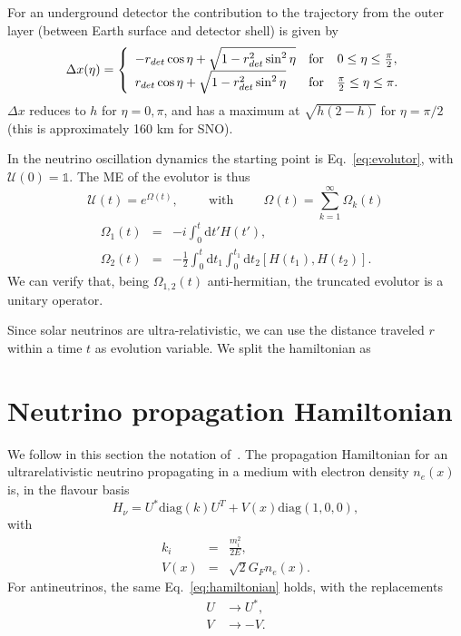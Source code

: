 \documentclass{article}
\newcommand{\de}[0]{\text{d}}
\begin{document}
For an underground detector the contribution to the trajectory from the outer layer (between Earth surface and detector shell) is given by
\begin{equation}
	 \Delta x(\eta) = \left\{ \begin{array}{l c c}
		-r_{det} \cos\eta + \sqrt{1 - r_{det}^2 \sin^2 \eta} & \text{for} & 0 \leq \eta \leq \frac{\pi}{2}, \\
		r_{det} \cos\eta + \sqrt{1 - r_{det}^2 \sin^2 \eta} & \text{for} & \frac{\pi}{2} \leq \eta \leq \pi.
	\end{array} \right.
\end{equation}
$\Delta x$ reduces to $h$ for $\eta=0, \pi$, and has a maximum at $\sqrt{h(2-h)}$ for $\eta=\pi/2$ (this is approximately 160 km for SNO).

In the neutrino oscillation dynamics the starting point is Eq.~\ref{eq:evolutor}, with ${\mathcal{U}(0) = \mathbb{1}}$. The ME of the evolutor is thus
\begin{equation}
	\mathcal{U}(t) = e^{\Omega(t)},\hspace{1cm} \text{with} \hspace{1cm} \Omega(t) = \sum_{k=1}^\infty \Omega_k (t)
\end{equation}
\begin{eqnarray}
	\Omega_1(t) &=& -i \int_0^t \de t' H(t'), \label{eq:ME1}\\
	\Omega_2(t) &=& -\frac{1}{2} \int_0^t \de t_1 \int_0^{t_1} \de t_2 \left[ H(t_1), H(t_2) \right]. \label{eq:ME2}
\end{eqnarray}
We can verify that, being $\Omega_{1,2}(t)$ anti-hermitian, the truncated evolutor is a unitary operator.

Since solar neutrinos are ultra-relativistic, we can use the distance traveled $r$ within a time $t$ as evolution variable. We split the hamiltonian as

\section{Neutrino propagation Hamiltonian}
We follow in this section the notation of~\cite{Fantini:2018itu}.
The propagation Hamiltonian for an ultrarelativistic neutrino propagating in a medium with electron density $n_e(x)$ is, in the flavour basis
\begin{equation}\label{eq:hamiltonian}
	H_\nu = U^* \text{diag}(k) U^T + V(x) \text{diag}(1,0,0),
\end{equation}
with
\begin{eqnarray}
	k_i &=& \frac{m_i^2}{2E},\\
	V(x) &=& \sqrt{2}G_F n_e(x).
\end{eqnarray}
For antineutrinos, the same Eq.~\ref{eq:hamiltonian} holds, with the replacements
\begin{eqnarray}
	U &\rightarrow U^*,\\
	V &\rightarrow -V.
\end{eqnarray}
\end{document}
